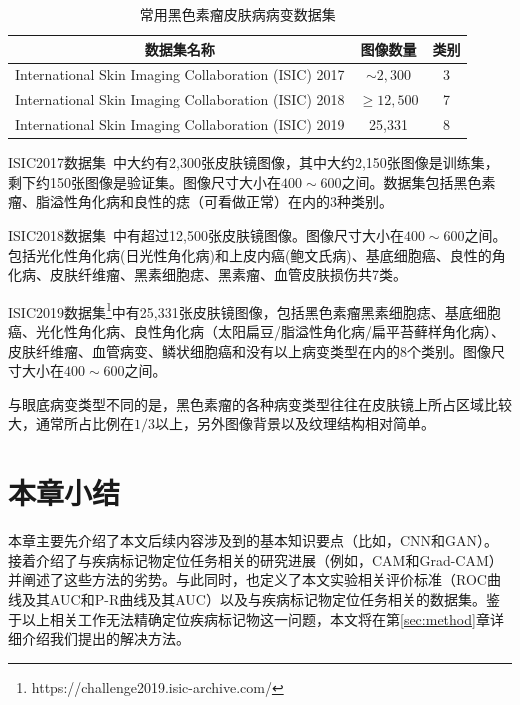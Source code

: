 \begin{table}[h]
	\centering
	\caption{常用黑色素瘤皮肤病病变数据集}		
	\label{tab:skin_datasets_info}
	\begin{tabular}{c|c|c}
		\toprule[2pt]
		数据集名称 & 图像数量 & 类别 \\
		\midrule[2pt]
		International Skin Imaging Collaboration (ISIC) 2017 &  $\sim 2,300$ & 3  \\ \hline
		International Skin Imaging Collaboration (ISIC) 2018 & $\geq 12,500$ & 7  \\ \hline
		International Skin Imaging Collaboration (ISIC) 2019 & 25,331 & 8    \\ 
		\bottomrule[2pt]
	\end{tabular}
\end{table}

ISIC2017数据集~\cite{codella2018skin}中大约有2,300张皮肤镜图像，其中大约2,150张图像是训练集，剩下约150张图像是验证集。图像尺寸大小在$400\sim 600$之间。数据集包括黑色素瘤、脂溢性角化病和良性的痣（可看做正常）在内的3种类别。

ISIC2018数据集~\cite{codella2019skin, tschandl2018ham10000}中有超过12,500张皮肤镜图像。图像尺寸大小在$400\sim 600$之间。包括光化性角化病(日光性角化病)和上皮内癌(鲍文氏病)、基底细胞癌、良性的角化病、皮肤纤维瘤、黑素细胞痣、黑素瘤、血管皮肤损伤共7类。

ISIC2019数据集\footnote{https://challenge2019.isic-archive.com/}中有25,331张皮肤镜图像，包括黑色素瘤黑素细胞痣、基底细胞癌、光化性角化病、良性角化病（太阳扁豆/脂溢性角化病/扁平苔藓样角化病）、皮肤纤维瘤、血管病变、鳞状细胞癌和没有以上病变类型在内的8个类别。图像尺寸大小在$400\sim 600$之间。

与眼底病变类型不同的是，黑色素瘤的各种病变类型往往在皮肤镜上所占区域比较大，通常所占比例在$1/3$以上，另外图像背景以及纹理结构相对简单。


\section{本章小结}
本章主要先介绍了本文后续内容涉及到的基本知识要点（比如，CNN和GAN）。接着介绍了与疾病标记物定位任务相关的研究进展（例如，CAM和Grad-CAM）并阐述了这些方法的劣势。与此同时，也定义了本文实验相关评价标准（ROC曲线及其AUC和P-R曲线及其AUC）以及与疾病标记物定位任务相关的数据集。鉴于以上相关工作无法精确定位疾病标记物这一问题，本文将在第\ref{sec:method}章详细介绍我们提出的解决方法。

